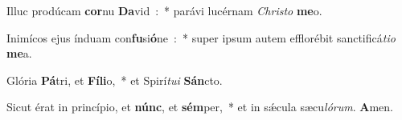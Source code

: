 \item Illuc prodúcam \textbf{cor}\-nu \textbf{Da}\-vid~:~* parávi lucérnam \emph{Chri}\-\emph{sto} \textbf{me}\-o.
\item Inimícos ejus índuam con\textbf{fu}\-si\textbf{ó}\-ne~:~* super ipsum autem efflorébit sanctificá\emph{ti}\-\emph{o} \textbf{me}\-a.
\item Glória \textbf{Pá}\-tri, et \textbf{Fí}\-\textbf{li}\-o,~* et Spirí\emph{tu}\-\emph{i} \textbf{Sán}\-cto.
\item Sicut érat in princípio, et \textbf{núnc}, et \textbf{sém}\-per,~* et in sǽcula sæcu\emph{ló}\-\emph{rum}. \textbf{A}\-men.